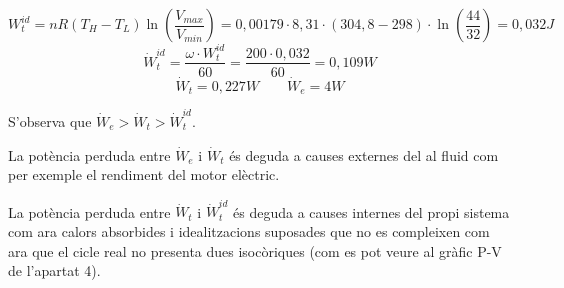 \documentclass[a4paper]{article}
\begin{document}
$$
W_t^{id} = nR(T_H - T_L)\ln\left(\frac{V_{max}}{V_{min}}\right) = 
0,00179·8,31·(304,8 - 298)·\ln\left(\frac{44}{32}\right) = \boxed{0,032 J}
$$
$$
\dot{W}_t^{id} = \frac{\omega·W_t^{id}}{60} = \frac{200·0,032}{60} = \boxed{0,109 W}
$$
$$
\dot{W}_t = 0,227 W \qquad \dot{W}_e = 4 W
$$

S'observa que $ \dot{W}_e > \dot{W}_t > \dot{W}_t^{id} $. 

La potència perduda entre $\dot{W}_e$ i $\dot{W}_t$ és deguda a causes externes del al fluid com per exemple el rendiment del motor elèctric.

La potència perduda entre $\dot{W}_t$ i $\dot{W}_t^{id}$ és deguda a causes internes del propi sistema com ara calors absorbides i idealitzacions suposades que no es compleixen com ara que el cicle real no presenta dues isocòriques (com es pot veure al gràfic P-V de l'apartat 4).
	
	
	
\end{document}
